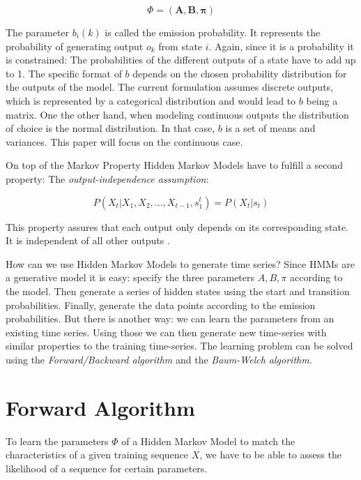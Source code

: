 \begin{equation}
\Phi=(\mathbf{A}, \mathbf{B}, \boldsymbol{\pi})
\end{equation}

The parameter $b_{i}(k)$ is called the emission probability. It represents the probability of generating output $o_k$ from state $i$. Again, since it is a probability it is constrained: The probabilities of the different outputs of a state have to add up to 1. The specific format of $b$ depends on the chosen probability distribution for the outputs of the model. 
The current formulation assumes discrete outputs, which is represented by a categorical distribution and would lead to $b$ being a matrix. One the other hand, when modeling continuous outputs the distribution of choice is the normal distribution. In that case, $b$ is a set of means and variances. This paper will focus on the continuous case.

On top of the Markov Property Hidden Markov Models have to fulfill a second property: The \emph{output-independence assumption}:

\begin{equation}
P\left(X_{t} |X_{1}, X_{2}, \ldots, X_{t-1}, s_{1}^{t}\right)=P\left(X_{t} | s_{t}\right)
\end{equation}

This property assures that each output only depends on its corresponding state. It is independent of all other outputs \parencite{huang2001spoken}.

How can we use Hidden Markov Models to generate time series? Since HMMs are a generative model it is easy: specify the three parameters $A, B, \pi$ according to the model. Then generate a series of hidden states using the start and transition probabilities. Finally, generate the data points according to the emission probabilities. But there is another way: we can learn the parameters from an existing time series. Using those we can then generate new time-series with similar properties to the training time-series. The learning problem can be solved using the \emph{Forward/Backward algorithm} and the \emph{Baum-Welch algorithm}.

\section{Forward Algorithm}

To learn the parameters $\Phi$ of a Hidden Markov Model to match the characteristics of a given training sequence $X$, we have to be able to assess the likelihood of a sequence for certain parameters. 

